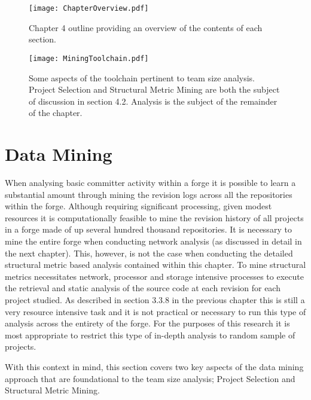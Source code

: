 \begin{landscape}
\begin{figure}[htbp!] 
\centering    
\texttt{[image: ChapterOverview.pdf]}
\caption{Chapter 4 outline providing an overview of the contents of each section.}
\label{fig:ChapterOverview}
\end{figure}
\end{landscape}

\begin{figure}[htbp!] 
\centering    
\texttt{[image: MiningToolchain.pdf]}
\caption[Some aspects of the toolchain pertinent to team size analysis.]{Some aspects of the toolchain pertinent to team size analysis. Project Selection and Structural Metric Mining are both the subject of discussion in section 4.2. Analysis is the subject of the remainder of the chapter.}
\label{fig:MiningToolchain}
\end{figure}
 

\section{Data Mining} %
When analysing basic committer activity within a forge it is possible to learn a substantial amount through mining the revision logs across all the repositories within the forge. Although requiring significant processing, given modest resources it is computationally feasible to mine the revision history of all projects in a forge made of up several hundred thousand repositories. It is necessary to mine the entire forge when conducting network analysis (as discussed in detail in the next chapter). This, however, is not the case when conducting the detailed structural metric based analysis contained within this chapter. To mine structural metrics necessitates network, processor and storage intensive processes to execute the retrieval and static analysis of the source code at each revision for each project studied. As described in section 3.3.8 in the previous chapter this is still a very resource intensive task and it is not practical or necessary to run this type of analysis across the entirety of the forge. For the purposes of this research it is most appropriate to restrict this type of in-depth analysis to random sample of projects. 

With this context in mind, this section covers two key aspects of the data mining approach that are foundational to the team size analysis; Project Selection and Structural Metric Mining. 

